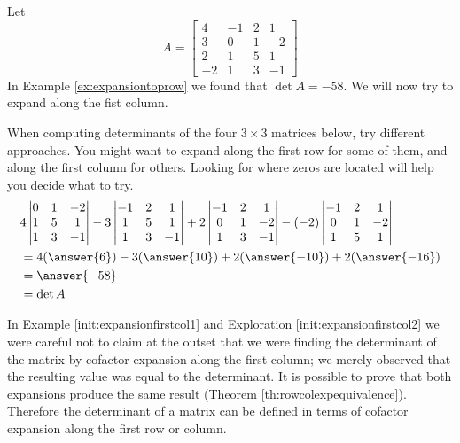 \documentclass{ximera}
\begin{document}
\begin{exploration}\label{init:expansionfirstcol2}
Let
$$A=\begin{bmatrix}4&-1&2&1\\3&0&1&-2\\
2&1&5&1\\-2&1&3&-1\end{bmatrix}$$
In Example \ref{ex:expansiontoprow} we found that $\det{A}=-58$.  We will now try to expand along the fist column.  

When computing determinants of the four $3\times 3$ matrices below, try different approaches.  You might want to expand along the first row for some of them, and along the first column for others.  Looking for where zeros are located will help you decide what to try.
\begin{align*}
&4\begin{vmatrix}0&1&-2\\1&5&1\\1&3&-1\end{vmatrix}-3\begin{vmatrix}-1&2&1\\1&5&1\\1&3&-1\end{vmatrix}+2\begin{vmatrix}-1&2&1\\0&1&-2\\1&3&-1\end{vmatrix}-(-2)\begin{vmatrix}-1&2&1\\0&1&-2\\1&5&1\end{vmatrix}\\
&=4(\answer{6})-3(\answer{10})+2(\answer{-10})+2(\answer{-16})\\
&=\answer{-58}\\
&=\det{A}
\end{align*}
\end{exploration}

In Example \ref{init:expansionfirstcol1} and Exploration \ref{init:expansionfirstcol2} we were careful not to claim at the outset that we were finding the determinant of the matrix by cofactor expansion along the first column; we merely observed that the resulting value was equal to the determinant.  It is possible to prove that both expansions produce the same result (Theorem \ref{th:rowcolexpequivalence}).  Therefore the determinant of a matrix can be defined in terms of cofactor expansion along the first row or column.  
\end{document}
